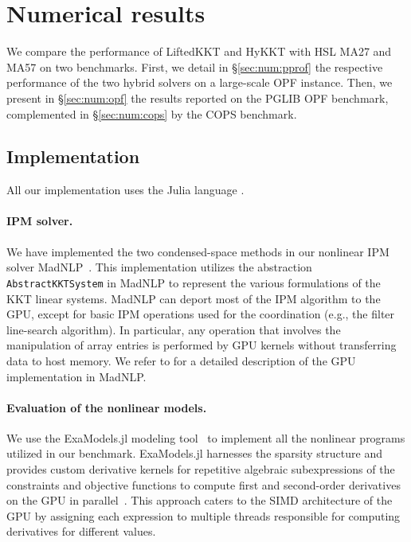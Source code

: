 \section{Numerical results}
We compare the performance of LiftedKKT and HyKKT with HSL MA27 and MA57 on two benchmarks.
First, we detail in \S\ref{sec:num:pprof} the respective performance of the two hybrid solvers
on a large-scale OPF instance. Then, we present in \S\ref{sec:num:opf}
the results reported on the PGLIB OPF benchmark, complemented in \S\ref{sec:num:cops} by
the COPS benchmark.

\subsection{Implementation}
All our implementation uses the Julia language \cite{bezanson-edelman-karpinski-shah-2017}.

\paragraph{IPM solver.}
We have implemented the two condensed-space methods in our nonlinear IPM solver MadNLP~\cite{shin2021graph}.
This implementation utilizes the abstraction {\tt AbstractKKTSystem}
in MadNLP to represent the various formulations of the KKT linear systems.
MadNLP can deport most of the IPM algorithm to the GPU, except for basic IPM operations used for the coordination (e.g., the filter line-search algorithm).
In particular, any operation that involves the manipulation of array entries is performed by GPU kernels without transferring data to host memory.
We refer to \cite{shin2023accelerating} for a detailed description of the GPU implementation in MadNLP.

\paragraph{Evaluation of the nonlinear models.}
We use the ExaModels.jl modeling tool~\cite{shin2023accelerating} to implement all the nonlinear programs utilized in our benchmark.
ExaModels.jl harnesses the sparsity structure and provides custom derivative kernels for repetitive algebraic subexpressions of the constraints and objective functions to compute first and second-order derivatives on the GPU in parallel~\cite{bischof1991exploiting,enzyme2021}.
This approach caters to the SIMD architecture of the GPU by assigning each expression to multiple threads responsible for computing derivatives for different values.

